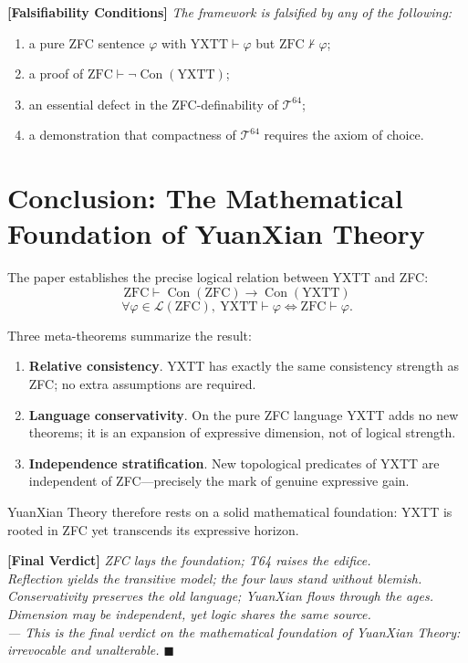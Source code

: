 \documentclass[12pt,a4paper]{article}
\newcommand{\boxeq}[1]{\boxed{\displaystyle #1}}
\theoremstyle{plain}
\theoremstyle{definition}
\newenvironment{verdict}
{\par\vspace{0.3em}\noindent\textbf{[Final Verdict]}\itshape}
{\hfill$\blacksquare$\par\vspace{0.5em}}
\newenvironment{falsifybox}
{\par\vspace{0.3em}\noindent\textbf{[Falsifiability Conditions]}\itshape}
{\par\vspace{0.3em}}
\newcommand{\Tsixtyfour}{\mathcal{T}^{64}}
\newcommand{\YXTT}{\mathrm{YXTT}}
\newcommand{\ZFC}{\mathrm{ZFC}}
\newcommand{\Con}{\operatorname{Con}}
\begin{document}
\begin{falsifybox}
The framework is falsified by any of the following:
\begin{enumerate}
  \item a pure ZFC sentence $\varphi$ with $\YXTT\vdash\varphi$ but $\ZFC\nvdash\varphi$;
  \item a proof of $\ZFC\vdash\neg\Con(\YXTT)$;
  \item an essential defect in the ZFC-definability of $\Tsixtyfour$;
  \item a demonstration that compactness of $\Tsixtyfour$ requires the axiom of choice.
\end{enumerate}
\end{falsifybox}

\section{Conclusion: The Mathematical Foundation of YuanXian Theory}
\label{sec:conclusion}

The paper establishes the precise logical relation between YXTT and ZFC:
\begin{equation}
\boxeq{\ZFC \vdash \Con(\ZFC) \to \Con(\YXTT)}
\end{equation}
\begin{equation}
\boxeq{\forall\varphi\in\mathcal{L}(\ZFC),\ \YXTT\vdash\varphi\iff\ZFC\vdash\varphi}.
\end{equation}

Three meta-theorems summarize the result:
\begin{enumerate}
  \item \textbf{Relative consistency}. YXTT has exactly the same consistency strength as ZFC; no extra assumptions are required.
  \item \textbf{Language conservativity}. On the pure ZFC language YXTT adds no new theorems; it is an expansion of expressive dimension, not of logical strength.
  \item \textbf{Independence stratification}. New topological predicates of YXTT are independent of ZFC---precisely the mark of genuine expressive gain.
\end{enumerate}

YuanXian Theory therefore rests on a solid mathematical foundation: YXTT is rooted in ZFC yet transcends its expressive horizon.

\begin{verdict}
ZFC lays the foundation; T64 raises the edifice.\\
Reflection yields the transitive model; the four laws stand without blemish.\\
Conservativity preserves the old language; YuanXian flows through the ages.\\
Dimension may be independent, yet logic shares the same source.\\
--- This is the final verdict on the mathematical foundation of YuanXian Theory: irrevocable and unalterable.
\end{verdict}
\end{document}
